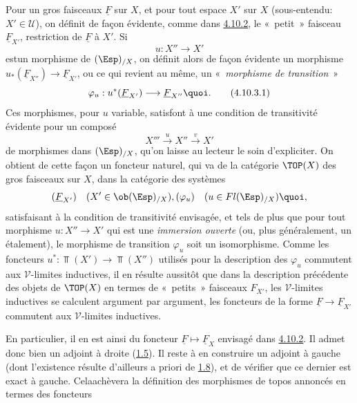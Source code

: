 \documentclass[10pt]{../fichiers-configuration-latex/smfart}
\begin{document}
\subsubsection{}
Pour un gros faisceaux $\underline{F}$ sur $X$, et pour tout espace $X'$
sur $X$ (sous-entendu: $X'\in 𝒰$), on définit de façon
évidente, comme dans \hyperref[IV.subsubsec4.10.2]{4.10.2}, le « petit »
faisceau $\underline{F}_{X'}$, restriction de $\underline{F}$ à $X'$. Si
$$
u:X''\longrightarrow X'
$$
est\pageoriginale  un morphisme de $(\Esp)_{/X}$, on définit alors
de façon évidente un morphisme
$u_{\ast}(\underline{F}_{X''})\rightarrow \underline{F}_{X'}$, ou ce qui
revient au même, un « \emph{morphisme de transition} »
\begin{equation*}
\varphi_u :u^{\ast}(\underline{F}_{X'})\longrightarrow
\underline{F}_{X''}{\quoi}. \tag{4.10.3.1}
\end{equation*}
Ces morphismes, pour $u$ variable, satisfont à une condition de
transitivité évidente pour un composé
$$
X'''\xrightarrow{u}X''\xrightarrow{v}X'
$$
de morphismes dans $(\Esp)_{/X}$, qu'on laisse au lecteur le soin
d'expliciter. On obtient de cette façon un foncteur naturel, qui
va de la catégorie $\TOP(X)$ des gros faisceaux sur $X$, dans la
catégorie des systèmes
$$
(\underline{F}_{X'})\quad(X'\in \ob (\Esp)_{/X}), (\varphi_u)\quad(u\in
Fl(\Esp)_{/X}){\quoi},
$$
satisfaisant à la condition de transitivité envisagée, et tels de
plus que pour tout morphisme $u:X''\rightarrow X'$ qui est une
\emph{immersion ouverte} (ou, plus généralement, un étalement), le
morphisme de transition $\varphi_u$ soit un isomorphisme. Comme les
foncteurs $u^{\ast}:\Top(X')\rightarrow \Top(X'')$ utilisés pour la
description des $\varphi_u$ commutent aux $𝒱$-limites
inductives, il en résulte aussitôt que dans la description
précédente des objets de $\TOP(X)$ en termes de « petits »
faisceaux $F_{X'}$, les $𝒱$-limites inductives se calculent
argument par argument, \ie les foncteurs de la forme
$\underline{F}\rightarrow \underline{F}_{X'}$ commutent aux
$𝒱$-limites inductives.

En particulier, il en est ainsi du foncteur $\underline{F}\mapsto
\underline{F}_X$ envisagé dans \hyperref[IV.subsubsec4.10.2]{4.10.2}. Il admet donc
bien un adjoint à droite (\hyperref[IV.cor1.5]{1.5}). Il reste à en construire
un adjoint à gauche (dont l'existence résulte d'ailleurs a priori de
\hyperref[IV.rem1.8]{1.8}), et de vérifier que ce dernier est exact à gauche.
Cela\pageoriginale achèvera la définition des morphismes de topos
annoncés  en termes des foncteurs 
\end{document}
